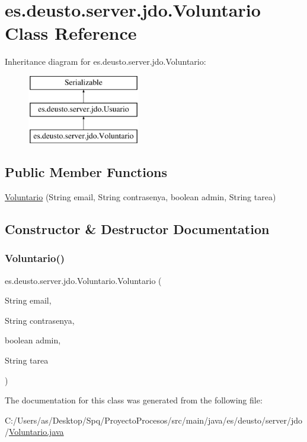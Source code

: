 \hypertarget{classes_1_1deusto_1_1server_1_1jdo_1_1_voluntario}{}\section{es.\+deusto.\+server.\+jdo.\+Voluntario Class Reference}
\label{classes_1_1deusto_1_1server_1_1jdo_1_1_voluntario}
Inheritance diagram for es.\+deusto.\+server.\+jdo.\+Voluntario\+:\begin{figure}[H]
\begin{center}
\leavevmode
\includegraphics[height=3.000000cm]{classes_1_1deusto_1_1server_1_1jdo_1_1_voluntario}
\end{center}
\end{figure}
\subsection*{Public Member Functions}
\begin{DoxyCompactItemize}
\item 
\mbox{\hyperlink{classes_1_1deusto_1_1server_1_1jdo_1_1_voluntario_ae26f14b66ac7833c184c872571467978}{Voluntario}} (String email, String contrasenya, boolean admin, String tarea)
\end{DoxyCompactItemize}


\subsection{Constructor \& Destructor Documentation}
\mbox{\label{classes_1_1deusto_1_1server_1_1jdo_1_1_voluntario_ae26f14b66ac7833c184c872571467978}} 
\subsubsection{\texorpdfstring{Voluntario()}{Voluntario()}}
{\footnotesize\ttfamily es.\+deusto.\+server.\+jdo.\+Voluntario.\+Voluntario (\begin{DoxyParamCaption}\item[{String}]{email,  }\item[{String}]{contrasenya,  }\item[{boolean}]{admin,  }\item[{String}]{tarea }\end{DoxyParamCaption})}



The documentation for this class was generated from the following file\+:\begin{DoxyCompactItemize}
\item 
C\+:/\+Users/as/\+Desktop/\+Spq/\+Proyecto\+Procesos/src/main/java/es/deusto/server/jdo/\mbox{\hyperlink{_voluntario_8java}{Voluntario.\+java}}\end{DoxyCompactItemize}
